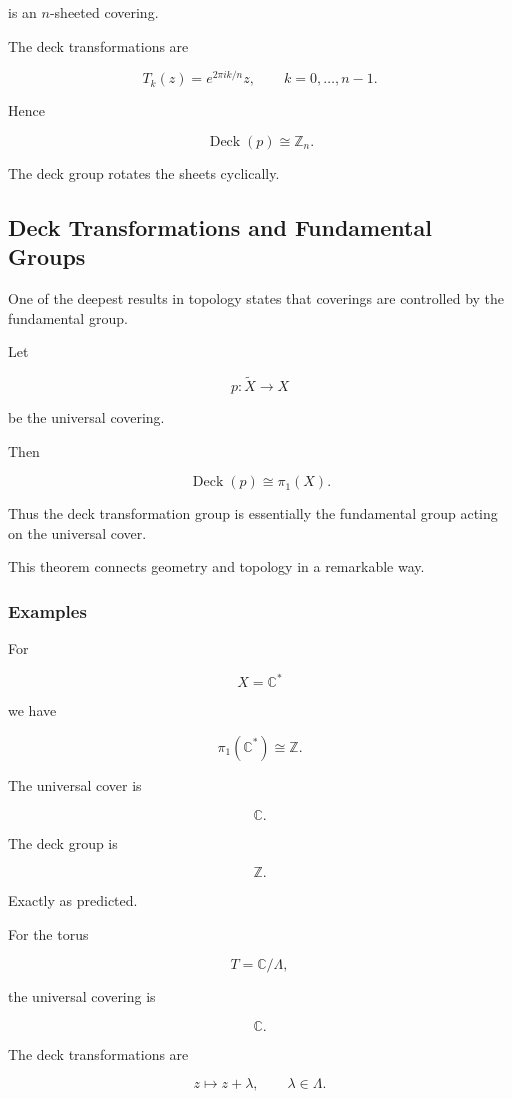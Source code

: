 \documentclass[12pt,a4paper]{article}
\theoremstyle{notespace}
\begin{document}
is an \(n\)-sheeted covering.

The deck transformations are

\[
T_k(z)
=
e^{2\pi i k/n}z,
\qquad
k=0,\ldots,n-1.
\]

Hence

\[
\operatorname{Deck}(p)
\cong
\mathbb Z_n.
\]

The deck group rotates the sheets cyclically.

\subsection{Deck Transformations and Fundamental Groups}

One of the deepest results in topology states that coverings are controlled by the fundamental group.

Let

\[
p:\widetilde X\to X
\]

be the universal covering.

Then

\[
\operatorname{Deck}(p)
\cong
\pi_1(X).
\]

Thus the deck transformation group is essentially the fundamental group acting on the universal cover.

This theorem connects geometry and topology in a remarkable way.

\subsubsection{Examples}

For

\[
X=\mathbb C^*
\]

we have

\[
\pi_1(\mathbb C^*)
\cong
\mathbb Z.
\]

The universal cover is

\[
\mathbb C.
\]

The deck group is

\[
\mathbb Z.
\]

Exactly as predicted.

\bigskip

For the torus

\[
T=\mathbb C/\Lambda,
\]

the universal covering is

\[
\mathbb C.
\]

The deck transformations are

\[
z\mapsto z+\lambda,
\qquad
\lambda\in\Lambda.
\]
\end{document}
